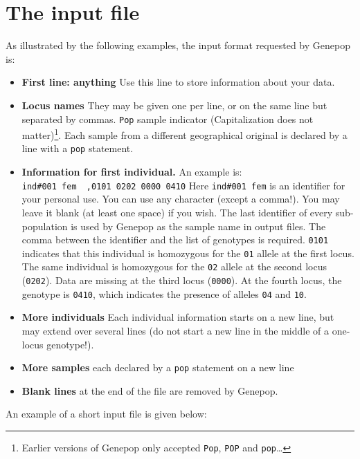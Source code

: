 \documentclass[12pt,]{book}
\providecommand{\tightlist}{%
  \setlength{\itemsep}{0pt}\setlength{\parskip}{0pt}}
\let\rmarkdownfootnote\footnote%
\def\footnote{\protect\rmarkdownfootnote}
\theoremstyle{definition}
\theoremstyle{definition}
\theoremstyle{definition}
\theoremstyle{remark}
\begin{document}
\chapter{The input file}\label{the-input-file}

 As illustrated by the following examples, the input
format requested by Genepop is:

\begin{itemize}
\tightlist
\item
  \textbf{First line: anything} Use this line to store information about
  your data.
\item
  \textbf{Locus names} They may be given one per line, or on the same
  line but separated by commas. \texttt{Pop} sample indicator
  (Capitalization does not matter)\footnote{Earlier versions of Genepop
    only accepted \texttt{Pop}, \texttt{POP} and \texttt{pop}\ldots{}}.
  Each sample from a different geographical original is declared by a
  line with a \texttt{pop} statement.
\item
  \textbf{Information for first individual.} An example is:
  \texttt{ind\#001\ fem\ \ ,0101\ 0202\ 0000\ 0410} Here
  \texttt{ind\#001\ fem} is an identifier for your personal use. You can
  use any character (except a comma!). You may leave it blank (at least
  one space) if you wish. The last identifier of every sub-population is
  used by Genepop as the sample name in output files. The comma between
  the identifier and the list of genotypes is required. \texttt{0101}
  indicates that this individual is homozygous for the \texttt{01}
  allele at the first locus. The same individual is homozygous for the
  \texttt{02} allele at the second locus (\texttt{0202}). Data are
  missing at the third locus (\texttt{0000}). At the fourth locus, the
  genotype is \texttt{0410}, which indicates the presence of alleles
  \texttt{04} and \texttt{10}.
\item
  \textbf{More individuals} Each individual information starts on a new
  line, but may extend over several lines (do not start a new line in
  the middle of a one-locus genotype!).
\item
  \textbf{More samples} each declared by a \texttt{pop} statement on a
  new line
\item
  \textbf{Blank lines} at the end of the file are removed by Genepop.
\end{itemize}

An example of a short input file is given below:
\end{document}
